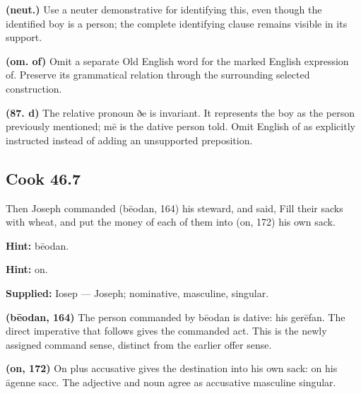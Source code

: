\textbf{(neut.)} Use a neuter demonstrative for identifying this, even though the identified boy is a person; the complete identifying clause remains visible in its support.

\textbf{(om. of)} Omit a separate Old English word for the marked English expression of. Preserve its grammatical relation through the surrounding selected construction.

\textbf{(87. d)} The relative pronoun ðe is invariant. It represents the boy as the person previously mentioned; mē is the dative person told. Omit English of as explicitly instructed instead of adding an unsupported preposition.

\par\begin{minipage}{\linewidth}\raggedright
\subsection*{Cook 46.7}

Then Joseph commanded (bēodan, 164) his steward, and said, Fill their sacks with wheat, and put the money of each of them into (on, 172) his own sack.

\textbf{Hint:} bēodan.

\textbf{Hint:} on.

\textbf{Supplied:} Iosep — Joseph; nominative, masculine, singular.

\textbf{(bēodan, 164)} The person commanded by bēodan is dative: his gerēfan. The direct imperative that follows gives the commanded act. This is the newly assigned command sense, distinct from the earlier offer sense.

\textbf{(on, 172)} On plus accusative gives the destination into his own sack: on his āgenne sacc. The adjective and noun agree as accusative masculine singular.

\end{minipage}\par\addvspace{4pt}

